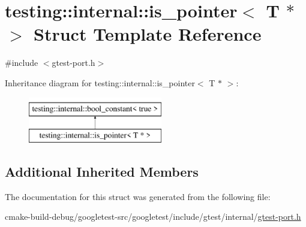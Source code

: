 \hypertarget{structtesting_1_1internal_1_1is__pointer_3_01T_01_5_01_4}{}\section{testing\+::internal\+::is\+\_\+pointer$<$ T $\ast$ $>$ Struct Template Reference}
\label{structtesting_1_1internal_1_1is__pointer_3_01T_01_5_01_4}


{\ttfamily \#include $<$gtest-\/port.\+h$>$}

Inheritance diagram for testing\+::internal\+::is\+\_\+pointer$<$ T $\ast$ $>$\+:\begin{figure}[H]
\begin{center}
\leavevmode
\includegraphics[height=2.000000cm]{structtesting_1_1internal_1_1is__pointer_3_01T_01_5_01_4}
\end{center}
\end{figure}
\subsection*{Additional Inherited Members}


The documentation for this struct was generated from the following file\+:\begin{DoxyCompactItemize}
\item 
cmake-\/build-\/debug/googletest-\/src/googletest/include/gtest/internal/\mbox{\hyperlink{gtest-port_8h}{gtest-\/port.\+h}}\end{DoxyCompactItemize}
